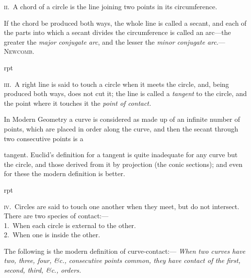 \documentclass[oneside]{book}
\newcounter{wrapwidth}
\newcommand\imgflow[3]{
\setcounter{wrapwidth}{#1}

\begin{wrapfigure}[#2]{r}{\value{wrapwidth}pt}
\begin{center}
\vspace{-0.3in}

\end{center}
\end{wrapfigure}
}
\begin{document}
\textsc{ii}.\ A chord of a circle is the line joining two points
in its circumference.\par\medskip

\begin{footnotesize}
If the chord be produced both ways, the whole line is called a
secant, and each of the parts into which a secant divides the circumference
is called an arc---the greater the \emph{major conjugate arc},
and the lesser the \emph{minor conjugate arc}.---\textsc{Newcomb}.
\par\end{footnotesize}\medskip


\imgflow{126}{10}{f100}

\textsc{iii}.\ A right line is said to
touch a circle when it meets
the circle, and, being produced
both ways, does not cut it;
the line is called a \emph{tangent}
to the circle, and the point
where it touches it the \emph{point
of contact.}\par\medskip

\begin{footnotesize}
In Modern Geometry a curve is considered as made up of an
infinite number of points, which are placed in order along the
curve, and then the secant through two consecutive points is a

tangent. Euclid's definition for a tangent is quite inadequate for
any curve but the circle, and those derived from it by projection
(the conic sections); and even for these the modern definition is
better.
\par\end{footnotesize}\medskip


\imgflow{160}{9}{f101}

\textsc{iv}.\ Circles are said to
touch one another when
they meet, but do not
intersect. There are two
species of contact:---\\
1.~When each circle is
external to the other.\\
2.~When one is inside
the other.\par\smallskip

\begin{footnotesize}
The following is the modern definition of curve-contact:---
\emph{When two curves have two, three, four, \&c., consecutive points
common, they have contact of the first, second, third, \&c., orders.}
\par\end{footnotesize}\smallskip
\end{document}
